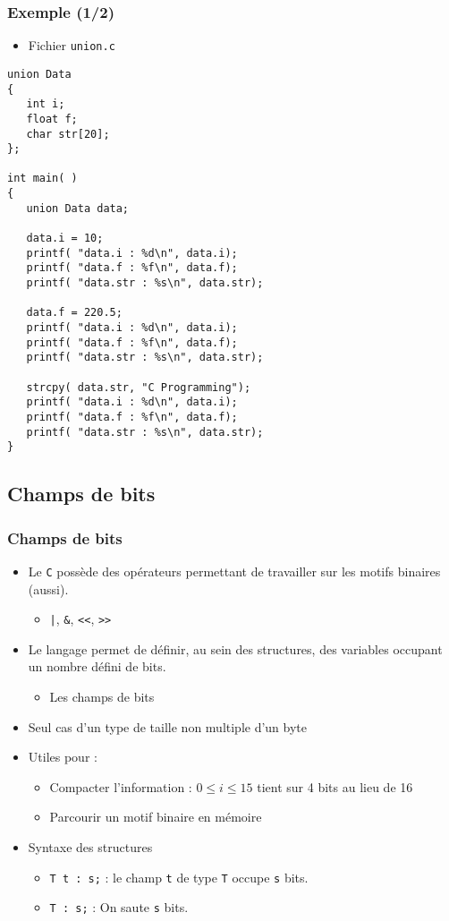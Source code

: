 \begin{frame}[containsverbatim]
\frametitle{Exemple (1/2)}
\begin{itemize}
\item Fichier \texttt{union.c}
\end{itemize}
\begin{lstlisting}
union Data 
{
   int i;
   float f;
   char str[20];
};
 
int main( ) 
{
   union Data data;        

   data.i = 10;
   printf( "data.i : %d\n", data.i);
   printf( "data.f : %f\n", data.f);
   printf( "data.str : %s\n", data.str);
   
   data.f = 220.5;
   printf( "data.i : %d\n", data.i);
   printf( "data.f : %f\n", data.f);
   printf( "data.str : %s\n", data.str);
   
   strcpy( data.str, "C Programming");
   printf( "data.i : %d\n", data.i);
   printf( "data.f : %f\n", data.f);
   printf( "data.str : %s\n", data.str);
}

\end{lstlisting}
\end{frame}

\subsection{Champs de bits}

\begin{frame}
\frametitle{Champs de bits}
\begin{itemize}[<+->]
\item Le \texttt{C} possède des opérateurs permettant de travailler sur les motifs binaires (\cpp aussi).
	\begin{itemize}
	\item \texttt{|}, \texttt{\&}, \texttt{<<}, \texttt{>>}
	\end{itemize}
\item Le langage permet de définir, au sein des structures, des variables occupant un nombre défini de bits.
	\begin{itemize}
	 \item Les champs de bits
	\end{itemize}
\item Seul cas d'un type de taille non multiple d'un byte
\item Utiles pour :
	\begin{itemize}
	\item Compacter l'information : $0 \leqslant i \leqslant 15$ tient sur 4 bits au lieu de 16
	\item Parcourir un motif binaire en mémoire
	\end{itemize}
\item Syntaxe des structures
	\begin{itemize}
	\item \texttt{T t : s;} : le champ \texttt{t} de type \texttt{T} occupe \texttt{s} bits.	
	\item \texttt{T : s;} : On saute \texttt{s} bits.
	\end{itemize}
\end{itemize}
\end{frame}


